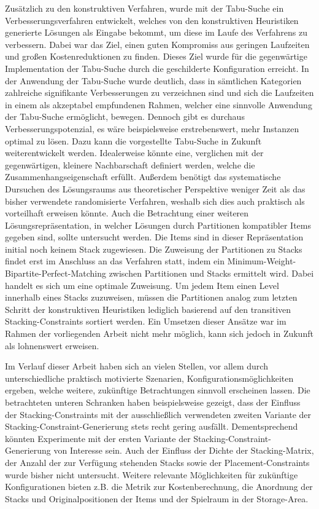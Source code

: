 Zusätzlich zu den konstruktiven Verfahren, wurde mit der Tabu-Suche ein Verbesserungsverfahren entwickelt,
welches von den konstruktiven Heuristiken generierte Lösungen als Eingabe bekommt, um diese
im Laufe des Verfahrens zu verbessern. Dabei war das Ziel, einen guten Kompromiss aus geringen Laufzeiten
und großen Kostenreduktionen zu finden. Dieses Ziel wurde für die gegenwärtige Implementation der Tabu-Suche durch die geschilderte Konfiguration erreicht. In der Anwendung der Tabu-Suche wurde deutlich, dass in sämtlichen Kategorien zahlreiche signifikante Verbesserungen zu verzeichnen sind und sich die Laufzeiten in einem als akzeptabel empfundenen Rahmen, welcher eine sinnvolle Anwendung der Tabu-Suche ermöglicht, bewegen.
Dennoch gibt es durchaus Verbesserungspotenzial, es wäre beispielsweise erstrebenswert,
mehr Instanzen optimal zu lösen. Dazu kann die vorgestellte Tabu-Suche in Zukunft weiterentwickelt werden.
Idealerweise könnte eine, verglichen mit der gegenwärtigen, kleinere Nachbarschaft definiert werden, welche die Zusammenhangseigenschaft erfüllt.
Außerdem benötigt das systematische Dursuchen des Lösungsraums aus theoretischer Perspektive weniger Zeit
als das bisher verwendete randomisierte Verfahren, weshalb sich dies auch praktisch als vorteilhaft erweisen könnte.
Auch die Betrachtung einer weiteren Lösungsrepräsentation, in welcher Lösungen durch Partitionen kompatibler Items
gegeben sind, sollte untersucht werden. Die Items sind in dieser Repräsentation initial noch
keinem Stack zugewiesen. Die Zuweisung der Partitionen zu Stacks findet erst im Anschluss an das Verfahren statt, indem ein Minimum-Weight-Bipartite-Perfect-Matching zwischen Partitionen und Stacks ermittelt wird. Dabei handelt es sich um eine optimale Zuweisung. Um jedem Item einen Level innerhalb eines Stacks zuzuweisen, müssen die Partitionen
analog zum letzten Schritt der konstruktiven Heuristiken lediglich basierend auf den transitiven Stacking-Constraints
sortiert werden. Ein Umsetzen dieser Ansätze war im Rahmen der vorliegenden Arbeit nicht mehr möglich, kann sich
jedoch in Zukunft als lohnenswert erweisen.

Im Verlauf dieser Arbeit haben sich an vielen Stellen, vor allem durch unterschiedliche praktisch motivierte Szenarien, Konfigurationsmöglichkeiten ergeben, welche weitere, zukünftige Betrachtungen sinnvoll erscheinen lassen.
Die betrachteten unteren Schranken haben beispielsweise gezeigt, dass der Einfluss der Stacking-Constraints mit der ausschließlich verwendeten zweiten Variante der Stacking-Constraint-Generierung stets recht gering ausfällt. Dementsprechend könnten Experimente mit der ersten Variante der Stacking-Constraint-Generierung von Interesse sein.
Auch der Einfluss der Dichte der Stacking-Matrix, der Anzahl der zur Verfügung stehenden Stacks sowie der Placement-Constraints wurde bisher nicht untersucht. Weitere relevante Möglichkeiten für zukünftige Konfigurationen bieten z.B. die Metrik zur Kostenberechnung, die Anordnung der Stacks und Originalpositionen der Items und der Spielraum in der Storage-Area.

